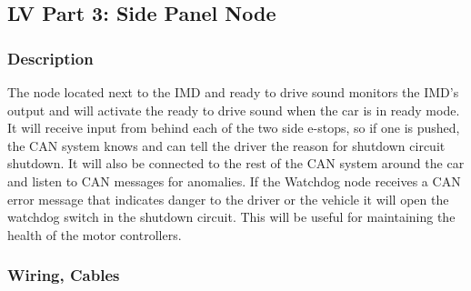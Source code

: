 \documentclass{article}
\begin{document}
    \subsection{LV Part 3: Side Panel Node} \label{imdnode}

        \subsubsection{Description}

            The node located next to the IMD and ready to drive sound monitors the IMD's output and will activate the ready to drive sound when the car is in ready mode. It will receive input from behind each of the two side e-stops, so if one is pushed, the CAN system knows and can tell the driver the reason for shutdown circuit shutdown. It will also be connected to the rest of the CAN system around the car and listen to CAN messages for anomalies. If the Watchdog node receives a CAN error message that indicates danger to the driver or the vehicle it will open the watchdog switch in the shutdown circuit. This will be useful for maintaining the health of the motor controllers.

        \subsubsection{Wiring, Cables}

\end{document}
